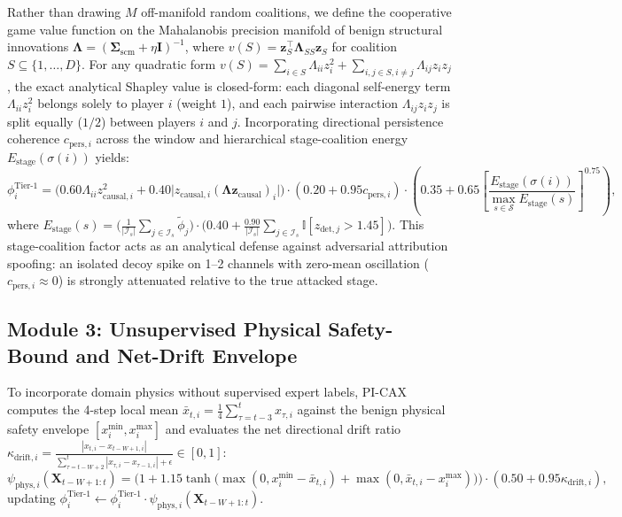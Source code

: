 \documentclass[10pt,a4paper]{article}
\begin{document}
Rather than drawing $M$ off-manifold random coalitions, we define the cooperative game value function on the Mahalanobis precision manifold of benign structural innovations $\boldsymbol{\Lambda} = (\boldsymbol{\Sigma}_{\text{scm}} + \eta \mathbf{I})^{-1}$, where $v(S) = \mathbf{z}_S^\top \boldsymbol{\Lambda}_{SS} \mathbf{z}_S$ for coalition $S \subseteq \{1, \dots, D\}$. For any quadratic form $v(S) = \sum_{i \in S} \Lambda_{ii} z_i^2 + \sum_{i,j \in S, i \neq j} \Lambda_{ij} z_i z_j$, the exact analytical Shapley value is closed-form: each diagonal self-energy term $\Lambda_{ii} z_i^2$ belongs solely to player $i$ (weight $1$), and each pairwise interaction $\Lambda_{ij} z_i z_j$ is split equally ($1/2$) between players $i$ and $j$. Incorporating directional persistence coherence $c_{\text{pers},i}$ across the window and hierarchical stage-coalition energy $E_{\text{stage}}(\sigma(i))$ yields:
\begin{equation}\label{eq:pi_shapley}
    \phi_i^{\text{Tier-1}} = \Big(0.60 \Lambda_{ii} z_{\text{causal},i}^2 + 0.40 \big|z_{\text{causal},i} (\boldsymbol{\Lambda} \mathbf{z}_{\text{causal}})_i\big|\Big) \cdot (0.20 + 0.95 c_{\text{pers},i}) \cdot \left(0.35 + 0.65 \left[\frac{E_{\text{stage}}(\sigma(i))}{\max_{s \in \mathcal{S}} E_{\text{stage}}(s)}\right]^{0.75}\right),
\end{equation}
where $E_{\text{stage}}(s) = \big(\frac{1}{|\mathcal{I}_s|}\sum_{j \in \mathcal{I}_s} \tilde{\phi}_j\big) \cdot \big(0.40 + \frac{0.90}{|\mathcal{I}_s|}\sum_{j \in \mathcal{I}_s} \mathbb{I}[z_{\text{det},j} > 1.45]\big)$. This stage-coalition factor acts as an analytical defense against adversarial attribution spoofing: an isolated decoy spike on 1--2 channels with zero-mean oscillation ($c_{\text{pers},i} \approx 0$) is strongly attenuated relative to the true attacked stage.

\subsection{Module 3: Unsupervised Physical Safety-Bound and Net-Drift Envelope}

To incorporate domain physics without supervised expert labels, PI-CAX computes the 4-step local mean $\bar{x}_{t,i} = \frac{1}{4}\sum_{\tau=t-3}^t x_{\tau,i}$ against the benign physical safety envelope $[x_i^{\min}, x_i^{\max}]$ and evaluates the net directional drift ratio $\kappa_{\text{drift},i} = \frac{|x_{t,i} - x_{t-W+1,i}|}{\sum_{\tau=t-W+2}^t |x_{\tau,i} - x_{\tau-1,i}| + \epsilon} \in [0, 1]$:
\begin{equation}\label{eq:phys_envelope}
    \psi_{\text{phys},i}(\mathbf{X}_{t-W+1:t}) = \Big(1 + 1.15 \tanh\big(\max(0, x_i^{\min} - \bar{x}_{t,i}) + \max(0, \bar{x}_{t,i} - x_i^{\max})\big)\Big) \cdot (0.50 + 0.95 \kappa_{\text{drift},i}),
\end{equation}
updating $\phi_i^{\text{Tier-1}} \leftarrow \phi_i^{\text{Tier-1}} \cdot \psi_{\text{phys},i}(\mathbf{X}_{t-W+1:t})$.
\end{document}
